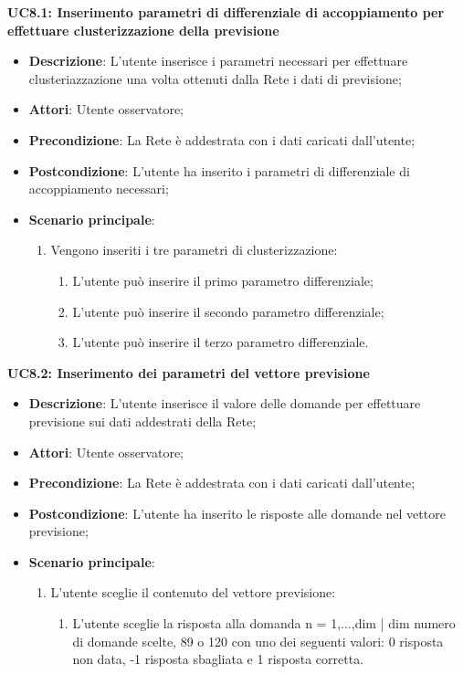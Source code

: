 \textbf{UC8.1: Inserimento parametri di differenziale di accoppiamento per effettuare clusterizzazione della previsione}
\label{UC8.1: Inserimento parametri di differenziale di accoppiamento per effettuare clusterizzazione della previsione}
\noindent
\begin{itemize}
\item \textbf{Descrizione}: L'utente inserisce i parametri necessari per effettuare clusteriazzazione una volta ottenuti dalla Rete i dati di previsione;
\item \textbf{Attori}: Utente osservatore;
\item \textbf{Precondizione}: La Rete \`e addestrata con i dati caricati dall'utente;
\item \textbf{Postcondizione}: L'utente ha inserito i parametri di differenziale di accoppiamento necessari;
\item \textbf{Scenario principale}:
\begin{enumerate} 
\item Vengono inseriti i tre parametri di clusterizzazione:
\begin{enumerate}
\item L'utente pu\`o inserire il primo parametro differenziale;
\item L'utente pu\`o inserire il secondo parametro differenziale;
\item L'utente pu\`o inserire il terzo parametro differenziale.
\end{enumerate}
\end{enumerate}
\end{itemize}

\textbf{UC8.2: Inserimento dei parametri del vettore previsione}\mbox{}
\label{UC8.2: Inserimento dei parametri del vettore previsione}
\noindent
\begin{itemize}
\item \textbf{Descrizione}: L'utente inserisce il valore delle domande per effettuare previsione sui dati addestrati della Rete;
\item \textbf{Attori}: Utente osservatore;
\item \textbf{Precondizione}: La Rete \`e addestrata con i dati caricati dall'utente;
\item \textbf{Postcondizione}: L'utente ha inserito le risposte alle domande nel vettore previsione;
\item \textbf{Scenario principale}:
\begin{enumerate}
\item L'utente sceglie il contenuto del vettore previsione:
\begin{enumerate}
\item L'utente sceglie la risposta alla domanda n = {1,...,dim | dim numero di domande scelte, 89 o 120} con uno dei seguenti valori: 0 risposta non data, -1 risposta sbagliata e 1 risposta corretta.
\end{enumerate}
\end{enumerate}
\end{itemize}

